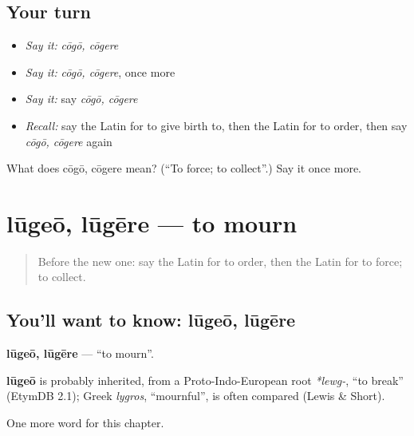 \subsection*{Your turn}
\begin{itemize}
\raggedright
  \item \emph{Say it:} \emph{cōgō, cōgere}
  \item \emph{Say it:} \emph{cōgō, cōgere}, once more
  \item \emph{Say it:} say \emph{cōgō, cōgere}
  \item \emph{Recall:} say the Latin for to give birth to, then the Latin for to order, then say \emph{cōgō, cōgere} again
\end{itemize}

\begin{tcolorbox}[breakable,colback=teal!4,colframe=teal!35!black,title={Before you move on}]
What does cōgō, cōgere mean? (\textquotedblleft{}To force; to collect\textquotedblright{}.) Say it once more.
\end{tcolorbox}
\section[lūgeō, lūgēre]{lūgeō, lūgēre — to mourn}

\label{lesson:LA-C261-lugeo}



\begin{quote}
Before the new one: say the Latin for to order, then the Latin for to force; to collect.
\end{quote}

\subsection*{You'll want to know: lūgeō, lūgēre}
\textbf{lūgeō, lūgēre} — \textquotedblleft{}to mourn\textquotedblright{}.

\begin{cousinweb}
\textbf{lūgeō} is probably inherited, from a Proto-Indo-European root \emph{*lewg-}, \textquotedblleft{}to break\textquotedblright{} (EtymDB 2.1); Greek \emph{lygros}, \textquotedblleft{}mournful\textquotedblright{}, is often compared (Lewis \& Short).
\end{cousinweb}

\begin{grammarlens}[title={What you've built}]
One more word for this chapter.
\end{grammarlens}

